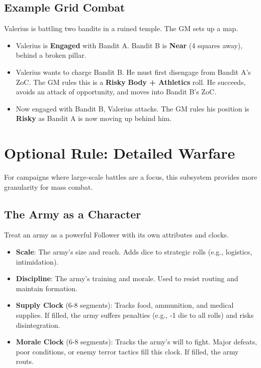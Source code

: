 \subsection*{Example Grid Combat}

Valerius is battling two bandits in a ruined temple. The GM sets up a map.
\begin{itemize}
    \item Valerius is \textbf{Engaged} with Bandit A. Bandit B is \textbf{Near} (4 squares away), behind a broken pillar.
    \item Valerius wants to charge Bandit B. He must first disengage from Bandit A's ZoC. The GM rules this is a \textbf{Risky} \textbf{Body + Athletics} roll. He succeeds, avoids an attack of opportunity, and moves into Bandit B's ZoC.
    \item Now engaged with Bandit B, Valerius attacks. The GM rules his position is \textbf{Risky} as Bandit A is now moving up behind him.
\end{itemize}

\section*{Optional Rule: Detailed Warfare}

For campaigns where large-scale battles are a focus, this subsystem provides more granularity for mass combat.

\subsection*{The Army as a Character}

Treat an army as a powerful Follower with its own attributes and clocks.
\begin{itemize}
    \item \textbf{Scale}: The army's size and reach. Adds dice to strategic rolls (e.g., logistics, intimidation).
    \item \textbf{Discipline}: The army's training and morale. Used to resist routing and maintain formation.
    \item \textbf{Supply Clock} (6-8 segments): Tracks food, ammunition, and medical supplies. If filled, the army suffers penalties (e.g., -1 die to all rolls) and risks disintegration.
    \item \textbf{Morale Clock} (6-8 segments): Tracks the army's will to fight. Major defeats, poor conditions, or enemy terror tactics fill this clock. If filled, the army routs.
\end{itemize}

